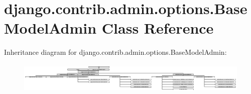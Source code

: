 \hypertarget{classdjango_1_1contrib_1_1admin_1_1options_1_1_base_model_admin}{}\section{django.\+contrib.\+admin.\+options.\+Base\+Model\+Admin Class Reference}
\label{classdjango_1_1contrib_1_1admin_1_1options_1_1_base_model_admin}
Inheritance diagram for django.\+contrib.\+admin.\+options.\+Base\+Model\+Admin\+:\begin{figure}[H]
\begin{center}
\leavevmode
\includegraphics[height=1.458333cm]{classdjango_1_1contrib_1_1admin_1_1options_1_1_base_model_admin}
\end{center}
\end{figure}
